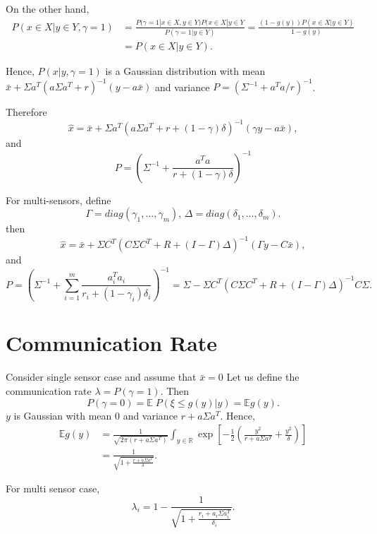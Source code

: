 \documentclass{article}
\begin{document}
On the other hand, 
\begin{align*}
  P(x\in X|y\in Y,\gamma = 1)& =  \frac{P(\gamma =1|x\in X,y\in Y)P(x\in X|y\in Y}{P(\gamma = 1|y\in Y)} = \frac{(1-g(y))P(x\in X|y\in Y)}{1-g(y)} \\
  &= P(x\in X|y\in Y).
\end{align*}

Hence, $P(x|y,\gamma=1)$ is a Gaussian distribution with mean $\bar x + \Sigma a^T(a\Sigma a^T + r)^{-1}(y - a\bar x)$ and variance $P = (\Sigma^{-1}+a^Ta/r)^{-1}$.

Therefore
\begin{displaymath}
  \hat x = \bar x + \Sigma a^T(a\Sigma a^T + r + (1-\gamma)\delta)^{-1}(\gamma y - a\bar x) ,
\end{displaymath}
and
\begin{displaymath}
   P = \left(\Sigma^{-1} + \frac{a^Ta}{r+(1-\gamma)\delta}\right)^{-1} 
\end{displaymath}

For multi-sensors, define 
\begin{displaymath}
 \Gamma = diag(\gamma_1,\dots,\gamma_m), \,\Delta =diag(\delta_1,\dots,\delta_m) .
\end{displaymath}
then
\begin{displaymath}
  \hat x = \bar x + \Sigma C^T(C\Sigma C^T + R + (I-\Gamma)\Delta)^{-1}(\Gamma y - C\bar x) ,
\end{displaymath}
and
\begin{displaymath}
  P = \left( \Sigma^{-1} +\sum_{i=1}^m \frac{a_i^Ta_i}{r_i+(1-\gamma_i)\delta_i}  \right)^{-1} = \Sigma - \Sigma C^T(C\Sigma C^T+R+(I-\Gamma)\Delta)^{-1}C\Sigma. 
\end{displaymath}
\section{Communication Rate}

Consider single sensor case and assume that $\bar x=0$ Let us define the communication rate $\lambda = P(\gamma = 1)$. Then
\begin{displaymath}
 P(\gamma = 0) = \mathbb E\;P(\xi\leq g(y)|y) =\mathbb E g(y). 
\end{displaymath}
$y$ is Gaussian with mean $0$ and variance $r + a\Sigma a^T$. Hence,
\begin{align*}
  \mathbb E g(y) & = \frac{1}{\sqrt{2\pi(r+a\Sigma a^T)}}\int_{y\in \mathbb R}\exp\left[ - \frac{1}{2}\left(\frac{y^2}{r+a\Sigma a^T}  + \frac{y^2}{\delta} \right) \right]\\
  &= \frac{1}{\sqrt{1+\frac{r+a\Sigma a^T}{\delta}}}.
\end{align*}

For multi sensor case,
\begin{displaymath}
 \lambda_i =  1-\frac{1}{\sqrt{1+\frac{r_i+a_i\Sigma a_i^T}{\delta_i}}}.
\end{displaymath}
\end{document}
